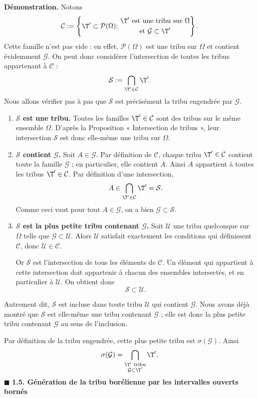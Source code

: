 \textbf{Démonstration.} Notons
\[\mathcal C:=\left\{\T'\subset\mathcal P(\Omega);\,\begin{gathered}\T'\text{ est une tribu sur }\Omega\\\text{et }\mathcal G\subset\T'\end{gathered}\right\}.\]
Cette famille n’est pas vide : en effet, $\mathcal P(\Omega)$ est une tribu sur $\Omega$ et contient évidemment $\mathcal G$. On peut donc considérer l’intersection de toutes les tribus appartenant à $\mathcal C$ :
\[\mathcal S:=\bigcap_{\T'\in\mathcal C}\T'.\]
Nous allons vérifier pas à pas que $\mathcal S$ est précisément la tribu engendrée par $\mathcal G$.
\begin{enumerate}
\item \textbf{$\mathcal S$ est une tribu.} Toutes les familles $\T'\in\mathcal C$ sont des tribus sur le même ensemble $\Omega$. D’après la Proposition « Intersection de tribus », leur intersection $\mathcal S$ est donc elle-même une tribu sur $\Omega$.
\item \textbf{$\mathcal S$ contient $\mathcal G$.} Soit $A\in\mathcal G$. Par définition de $\mathcal C$, chaque tribu $\T'\in\mathcal C$ contient toute la famille $\mathcal G$ ; en particulier, elle contient $A$. Ainsi $A$ appartient à toutes les tribus $\T'\in\mathcal C$. Par définition d’une intersection,
\[A\in\bigcap_{\T'\in\mathcal C}\T'=\mathcal S.\]
Comme ceci vaut pour tout $A\in\mathcal G$, on a bien $\mathcal G\subset\mathcal S$.
\item \textbf{$\mathcal S$ est la plus petite tribu contenant $\mathcal G$.} Soit $\mathcal U$ une tribu quelconque sur $\Omega$ telle que $\mathcal G\subset\mathcal U$. Alors $\mathcal U$ satisfait exactement les conditions qui définissent $\mathcal C$, donc $\mathcal U\in\mathcal C$.

Or $\mathcal S$ est l’intersection de tous les éléments de $\mathcal C$. Un élément qui appartient à cette intersection doit appartenir à chacun des ensembles intersectés, et en particulier à $\mathcal U$. On obtient donc
\[\mathcal S\subset\mathcal U.\]
\end{enumerate}
Autrement dit, $\mathcal S$ est incluse dans toute tribu $\mathcal U$ qui contient $\mathcal G$. Nous avons déjà montré que $\mathcal S$ est elle-même une tribu contenant $\mathcal G$ ; elle est donc la plus petite tribu contenant $\mathcal G$ au sens de l’inclusion.

Par définition de la tribu engendrée, cette plus petite tribu est $\sigma(\mathcal G)$. Ainsi
\[\sigma(\mathcal G)=\bigcap_{\substack{\T'\text{ tribu}\\\mathcal G\subset\T'}}\T'.\]
\hfill$\blacksquare$
\textbf{1.5. Génération de la tribu borélienne par les intervalles ouverts bornés}

